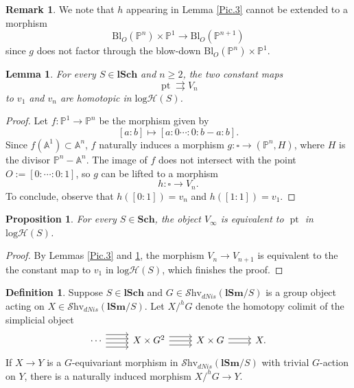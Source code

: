 \documentclass[11pt, a4paper]{amsart}
\newtheorem{prop}[thm]{Proposition}
\newtheorem{lem}[thm]{Lemma}
\theoremstyle{definition}
\newtheorem{df}[thm]{Definition}
\newtheorem{rmk}[thm]{Remark}
\numberwithin{equation}{subsection}
\renewcommand{\P}{\mathbb{P}}
\newcommand{\A}{\mathbb{A}}
\newcommand{\Sch}{\mathbf{Sch}}
\newcommand{\lSch}{\mathbf{lSch}}
\newcommand{\lSm}{\mathbf{lSm}}
\newcommand{\pt}[1]{\mathrm{\pt}_{#1}}
\newcommand{\Blow}{{\mathrm{Bl}}}
\newcommand{\boxx}{\square}
\newcommand{\cptsph}[1]{V_{#1}}
\def\pt{\operatorname{pt}}
\newcommand{\infShv}{\mathcal{S}\mathrm{hv}}
\newcommand{\inflogH}{\mathrm{log}\mathcal{H}}
\begin{document}
\begin{rmk}
We note that $h$ appearing in Lemma \ref{Pic.3} cannot be extended to a morphism
\[
\Blow_O(\P^n)\times \P^1\to \Blow_O(\P^{n+1})
\]
since $g$ does not factor through the blow-down $\Blow_O(\P^n)\times \P^1$.
\end{rmk}

\begin{lem}
\label{Pic.5}
For every $S\in \lSch$ and $n\geq 2$, the two constant maps
\[
\pt \rightrightarrows V_n
\]
to $v_1$ and $v_n$ are homotopic in $\inflogH(S)$.
\end{lem}
\begin{proof}
Let $f\colon \P^1\to \P^{n}$ be the morphism given by
\[
[a:b]
\mapsto 
[a:0\cdots : 0:b-a:b].
\]
Since $f(\A^1)\subset \A^n$, 
$f$ naturally induces a morphism $g\colon \boxx\to (\P^n,H)$, where $H$ is the divisor $\P^n-\A^n$.
The image of $f$ does not intersect with the point $O:=[0:\cdots:0:1]$, so $g$ can be lifted to a morphism
\[
h\colon \boxx \to V_n.
\]
To conclude, observe that $h([0:1])=v_n$ and $h([1:1])=v_1$.
\end{proof}

\begin{prop}
\label{Pic.4}
For every $S\in \Sch$, 
the object $\cptsph{\infty}$ is equivalent to $\pt$ in $\inflogH(S)$.
\end{prop}
\begin{proof}
By Lemmas \ref{Pic.3} and \ref{Pic.5}, 
the morphism $V_n\to V_{n+1}$ is equivalent to the the constant map to $v_1$ in $\inflogH(S)$,
which finishes the proof.
\end{proof}



\begin{df}
\label{Pic.11}
Suppose $S\in \lSch$ and $G\in \infShv_{dNis}(\lSm/S)$ is a group object acting on $X\in \infShv_{dNis}(\lSm/S)$.
Let $X/^h G$ denote the homotopy colimit of the simplicial object
\begin{equation}
\label{Pic.11.1}
\begin{tikzcd}
\cdots\ar[r,shift left=0.5ex]\ar[r,shift right=0.5ex]\ar[r,shift left=1.5ex]\ar[r,shift right=1.5ex]&
X\times G^2\ar[r,shift left=1ex]\ar[r,shift right=1ex]\ar[r]&
X\times G\ar[r,shift left=0.5ex]\ar[r,shift right=0.5ex]&
X.
\end{tikzcd}
\end{equation}
If $X\to Y$ is a $G$-equivariant morphism in $\infShv_{dNis}(\lSm/S)$ with trivial $G$-action on $Y$, 
there is a naturally induced morphism $X/^h G\to Y$.
\end{df}
\end{document}
